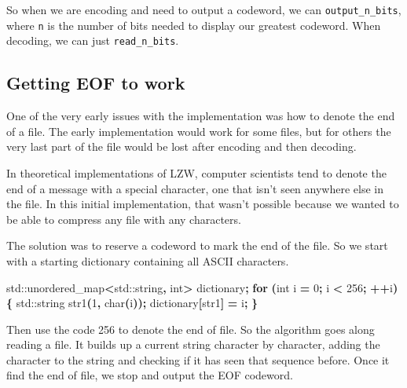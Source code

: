 \documentclass[12pt,twoside]{reedthesis}
\newenvironment{Shaded}{\begin{snugshade}}{\end{snugshade}}
\newcommand{\BuiltInTok}[1]{#1}
\newcommand{\ControlFlowTok}[1]{\textcolor[rgb]{0.13,0.29,0.53}{\textbf{#1}}}
\newcommand{\DataTypeTok}[1]{\textcolor[rgb]{0.13,0.29,0.53}{#1}}
\newcommand{\DecValTok}[1]{\textcolor[rgb]{0.00,0.00,0.81}{#1}}
\newcommand{\NormalTok}[1]{#1}
\newcommand{\OperatorTok}[1]{\textcolor[rgb]{0.81,0.36,0.00}{\textbf{#1}}}
\begin{document}
So when we are encoding and need to output a codeword, we can \texttt{output\_n\_bits}, where \texttt{n} is the number of bits needed to display our greatest codeword. When decoding, we can just \texttt{read\_n\_bits}.

\hypertarget{getting-eof-to-work}{%
\subsection{Getting EOF to work}\label{getting-eof-to-work}}

One of the very early issues with the implementation was how to denote the end of a file. The early implementation would work for some files, but for others the very last part of the file would be lost after encoding and then decoding.

In theoretical implementations of LZW, computer scientists tend to denote the end of a message with a special character, one that isn't seen anywhere else in the file. In this initial implementation, that wasn't possible because we wanted to be able to compress any file with any characters.

The solution was to reserve a codeword to mark the end of the file. So we start with a starting dictionary containing all ASCII characters.
\begin{Shaded}
\begin{Highlighting}[]
    \BuiltInTok{std::}\NormalTok{unordered\_map}\OperatorTok{\textless{}}\BuiltInTok{std::}\NormalTok{string}\OperatorTok{,} \DataTypeTok{int}\OperatorTok{\textgreater{}}\NormalTok{ dictionary}\OperatorTok{;}
    \ControlFlowTok{for} \OperatorTok{(}\DataTypeTok{int}\NormalTok{ i }\OperatorTok{=} \DecValTok{0}\OperatorTok{;}\NormalTok{ i }\OperatorTok{\textless{}} \DecValTok{256}\OperatorTok{;} \OperatorTok{++}\NormalTok{i}\OperatorTok{)\{}
        \BuiltInTok{std::}\NormalTok{string}\OperatorTok{ }\NormalTok{str1}\OperatorTok{(}\DecValTok{1}\OperatorTok{,} \DataTypeTok{char}\OperatorTok{(}\NormalTok{i}\OperatorTok{));}
\NormalTok{        dictionary}\OperatorTok{[}\NormalTok{str1}\OperatorTok{]} \OperatorTok{=}\NormalTok{ i}\OperatorTok{;}
    \OperatorTok{\}}
\end{Highlighting}
\end{Shaded}
Then use the code 256 to denote the end of file. So the algorithm goes along reading a file. It builds up a current string character by character, adding the character to the string and checking if it has seen that sequence before. Once it find the end of file, we stop and output the EOF codeword.
\end{document}
